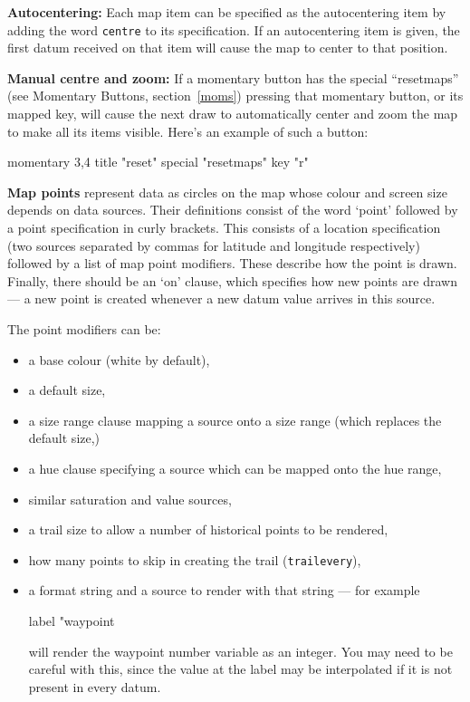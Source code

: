\textbf{Autocentering:} Each map item can be specified as the autocentering item by
adding the word \verb+centre+ to its specification. If an autocentering item is
given, the first datum received on that item will cause the map to center to that
position.

\textbf{Manual centre and zoom:} If a momentary button has the special ``resetmaps''
(see Momentary Buttons, section~\ref{moms}) pressing that momentary button, or
its mapped key, will cause the next draw to automatically center and zoom the map
to make all its items visible. Here's an example of such a button:
\begin{v}
momentary 3,4 {
    title "reset"
    special "resetmaps"
    key "r"
}
\end{v}


\textbf{Map points} represent data as circles on the map
whose colour and screen size depends on data sources.
Their definitions consist of the word `point' followed
by a point specification in curly brackets.
This consists of a location specification
(two sources separated by commas for latitude and longitude
respectively) followed by a list of map point modifiers.
These describe how the point is drawn. Finally, there should
be an `on' clause, which specifies how new points are drawn ---
a new point is created whenever a new datum value
arrives in this source.

The point modifiers can be:
\begin{itemize}
\item a base colour (white by default),
\item a default size,
\item a size range clause mapping a source onto a size range
(which replaces the default size,)
\item a hue clause specifying a source which can be mapped onto the 
hue range,
\item similar saturation and value sources,
\item a trail size to allow a number of historical points to be rendered,
\item how many points to skip in creating the trail (\texttt{trailevery}),
\item a format string and a source to render with that string --- for example 
\begin{v}
label "waypoint %
\end{v}
will render the waypoint number variable as an integer. You may need
to be careful with this, since the value at the label may be interpolated
if it is not present in every datum.
\end{itemize}

